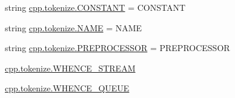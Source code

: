 \begin{DoxyCompactItemize}
string \mbox{\hyperlink{namespacecpp_1_1tokenize_a5e3bf1014a301906871113a989188a78}{cpp.\+tokenize.\+C\+O\+N\+S\+T\+A\+NT}} = \textquotesingle{}C\+O\+N\+S\+T\+A\+NT\textquotesingle{}
\item 
string \mbox{\hyperlink{namespacecpp_1_1tokenize_aa14251ded979d72f93d7b234d8cfb584}{cpp.\+tokenize.\+N\+A\+ME}} = \textquotesingle{}N\+A\+ME\textquotesingle{}
\item 
string \mbox{\hyperlink{namespacecpp_1_1tokenize_a3c8918ee13b9acf5ea4e70b484d67268}{cpp.\+tokenize.\+P\+R\+E\+P\+R\+O\+C\+E\+S\+S\+OR}} = \textquotesingle{}P\+R\+E\+P\+R\+O\+C\+E\+S\+S\+OR\textquotesingle{}
\item 
\mbox{\hyperlink{namespacecpp_1_1tokenize_a8dd117207e391864f7d9cb656e826a9e}{cpp.\+tokenize.\+W\+H\+E\+N\+C\+E\+\_\+\+S\+T\+R\+E\+AM}}
\item 
\mbox{\hyperlink{namespacecpp_1_1tokenize_ad02466a473c5e9c2ac256e18209f0967}{cpp.\+tokenize.\+W\+H\+E\+N\+C\+E\+\_\+\+Q\+U\+E\+UE}}
\end{DoxyCompactItemize}
